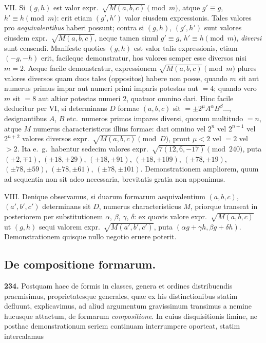 \documentclass[12pt,a4paper]{article}
\theoremstyle{plain}
\theoremstyle{definition}
\theoremstyle{remark}
\begin{document}
VII. Si $(g,h)$ est valor expr.\ $\sqrt{M(a,b,c)}\pmod{m}$, atque $g'\equiv g$, $h'\equiv h\pmod{m}$: erit etiam $(g',h')$ valor eiusdem expressionis. Tales valores pro \emph{aequivalentibus} haberi possunt; contra si $(g,h)$, $(g',h')$ sunt valores eiusdem expr.\ $\sqrt{M(a,b,c)}$, neque tamen simul $g'\equiv g$, $h'\equiv h\pmod{m}$, \emph{diversi} sunt censendi. Manifeste quoties $(g,h)$ est valor talis expressionis, etiam $(-g,-h)$ erit, facileque demonstratur, hos valores semper esse diversos nisi $m=2$. Aeque facile demonstratur, expressionem $\sqrt{M(a,b,c)}\pmod{m}$ plures valores diversos quam duos tales (oppositos) habere non posse, quando $m$ sit aut numerus primus impar aut numeri primi imparis potestas aut $=4$; quando vero $m$ sit $=8$ aut altior potestas numeri $2$, quatuor omnino dari. Hinc facile deducitur per VI, si determinans $D$ formae $(a,b,c)$ sit $=\pm 2^\mu A^\alpha B^\beta\ldots$, designantibus $A$, $B$ etc.\ numeros primos impares diversi, quorum multitudo $=n$, atque $M$ numerus characteristicus illius formae: dari omnino vel $2^n$ vel $2^{n+1}$ vel $2^{n+2}$ valores diversos expr.\ $\sqrt{M(a,b,c)}\pmod{D}$, prout $\mu<2$ vel $=2$ vel $>2$. Ita e.\ g.\ habentur sedecim valores expr.\ $\sqrt{7(12,6,-17)}\pmod{240}$, puta $(\pm 2, \mp 1)$, $(\pm 18, \pm 29)$, $(\pm 18, \pm 91)$, $(\pm 18, \pm 109)$, $(\pm 78, \pm 19)$, $(\pm 78, \pm 59)$, $(\pm 78, \pm 61)$, $(\pm 78, \pm 101)$. Demonstrationem ampliorem, quum ad sequentia non sit adeo necessaria, brevitatis gratia non apponimus.

VIII. Denique observamus, si duarum formarum aequivalentium $(a,b,c)$, $(a',b',c')$ determinans sit $D$, numerus characteristicus $M$, priorque transeat in posteriorem per substitutionem $\alpha$, $\beta$, $\gamma$, $\delta$: ex quovis valore expr.\ $\sqrt{M(a,b,c)}$ ut $(g,h)$ sequi valorem expr.\ $\sqrt{M(a',b',c')}$, puta $(\alpha g+\gamma h, \beta g+\delta h)$. Demonstrationem quisque nullo negotio eruere poterit.


\subsection*{De compositione formarum.}

\textbf{234.}
Postquam haec de formis in classes, genera et ordines distribuendis praemisimus, proprietatesque generales, quae ex his distinctionibus statim defluunt, explicavimus, ad aliud argumentum gravissimum transimus a nemine hucusque attactum, de formarum \emph{compositione}. In cuius disquisitionis limine, ne posthac demonstrationum seriem continuam interrumpere oporteat, statim intercalamus
\end{document}
